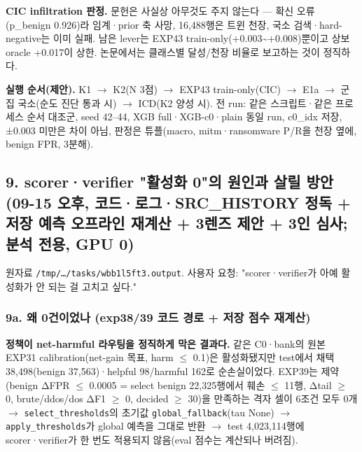 \textbf{CIC infiltration 판정.} 문헌은 사실상 아무것도 주지 않는다 — 확신 오류(p\_\allowbreak{}benign 0.926)라 임계·prior 축 사망, 16,488행은 트윈 천장, 국소 검색·hard-negative는 이미 실패. 남은 lever는 EXP43 train-only(+\allowbreak{}0.003\textasciitilde{}+\allowbreak{}0.008)뿐이고 상보 oracle +\allowbreak{}0.017이 상한. 논문에서는 클래스별 달성/\allowbreak{}천장 비율로 보고하는 것이 정직하다.

\textbf{실행 순서(제안).} K1  \ensuremath{\rightarrow}  K2(N 3점)  \ensuremath{\rightarrow}  EXP43 train-only(CIC)  \ensuremath{\rightarrow}  E1a  \ensuremath{\rightarrow}  군집 국소(순도 진단 통과 시)  \ensuremath{\rightarrow}  ICD(K2 양성 시). 전 run: 같은 스크립트·같은 프로세스 순서 대조군, seed 42–44, XGB full·XGB-c0·plain 동일 run, c0\_\allowbreak{}idx 저장, ±0.003 미만은 차이 아님, 판정은 튜플(macro, mitm·ransomware P/\allowbreak{}R을 천장 옆에, benign FPR, 3분해).

\subsection{9. scorer·verifier "활성화 0"의 원인과 살릴 방안 (09-15 오후, 코드·로그·SRC\_\allowbreak{}HISTORY 정독 +\allowbreak{} 저장 예측 오프라인 재계산 +\allowbreak{} 3렌즈 제안 +\allowbreak{} 3인 심사; 분석 전용, GPU 0)}
원자료 \texttt{/\allowbreak{}\allowbreak{}tmp/\allowbreak{}\allowbreak{}…/\allowbreak{}\allowbreak{}t\allowbreak{}asks/\allowbreak{}\allowbreak{}wbb\allowbreak{}1l5ft3.\allowbreak{}o\allowbreak{}utput}. 사용자 요청: "scorer·verifier가 아예 활성화가 안 되는 걸 고치고 싶다."

\subsubsection{9a. 왜 0건이었나 (exp38/\allowbreak{}39 코드 경로 +\allowbreak{} 저장 점수 재계산)}
\par\noindent \textbullet\enspace \textbf{정책이 net-harmful 라우팅을 정직하게 막은 결과다.} 같은 C0·bank의 원본 EXP31 calibration(net-gain 목표, harm \ensuremath{\leq} 0.1)은 활성화됐지만 test에서 채택 38,498(benign 37,563)·helpful 98/\allowbreak{}harmful 162로 순손실이었다. EXP39는 제약(benign ΔFPR \ensuremath{\leq} 0.0005 =\allowbreak{} select benign 22,325행에서 훼손 \ensuremath{\leq} 11행, Δtail \ensuremath{\geq} 0, brute/\allowbreak{}ddos/\allowbreak{}dos ΔF1 \ensuremath{\geq} 0, decided \ensuremath{\geq} 30)을 만족하는 격자 셀이 6조건 모두 0개  \ensuremath{\rightarrow}  \texttt{select\_\allowbreak{}\allowbreak{}t\allowbreak{}hreshold\allowbreak{}s}의 초기값 \texttt{global\_\allowbreak{}\allowbreak{}f\allowbreak{}allback}(tau None)  \ensuremath{\rightarrow}  \texttt{apply\_\allowbreak{}\allowbreak{}th\allowbreak{}resholds\allowbreak{}}가 global 예측을 그대로 반환  \ensuremath{\rightarrow}  test 4,023,114행에 scorer·verifier가 한 번도 적용되지 않음(eval 점수는 계산되나 버려짐).


